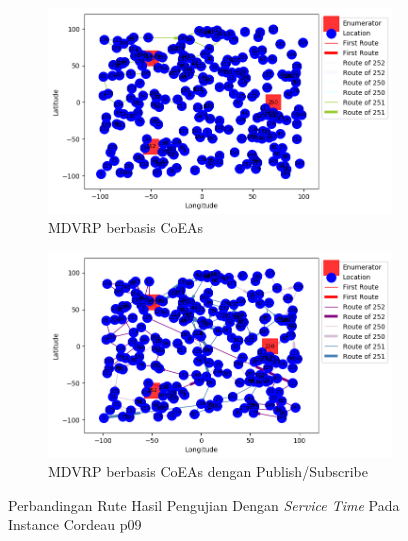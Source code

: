 \begin{figure}[H]
	\centering
	\begin{subfigure}[t]{\textwidth}
		\centering
		\includegraphics[width=\textwidth]{Resources/Images/cordeau_p09_tw/cordeau_p09_tw_coes}
		\caption{MDVRP berbasis CoEAs}
		\label{fig:cordeau_p09_tw_coes}
	\end{subfigure}
	\begin{subfigure}[t]{\textwidth}
		\centering
		\includegraphics[width=\textwidth]{Resources/Images/cordeau_p09_tw/cordeau_p09_tw_pubsub_coes}
		\caption{MDVRP berbasis CoEAs dengan Publish/Subscribe}
		\label{fig:cordeau_p09_tw_pubsub_coes}
	\end{subfigure}
	\caption{Perbandingan Rute Hasil Pengujian Dengan \textit{Service Time} Pada Instance Cordeau p09}
	\label{fig:cordeau_p09_tw}
\end{figure}


